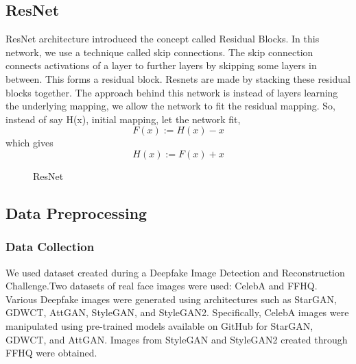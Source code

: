         \subsection{ResNet}
            ResNet\cite{DBLP:journals/corr/HeZRS15} architecture introduced the concept called Residual Blocks. In this network, we use a technique called skip connections. The skip connection connects activations of a  layer to further layers by skipping some layers in between. This forms a residual block. Resnets are made by stacking these residual blocks together. The approach behind this network is instead of layers learning the underlying mapping, we allow the network to fit the residual mapping. So, instead of say H(x), initial mapping, let the network fit,
            \begin{equation}
                F(x) := H(x) - x
            \end{equation}
            which gives
            \begin{equation}
                H(x) := F(x) + x
            \end{equation}
            \begin{figure}[hbt!]
                \caption{ResNet} \cite{enwiki:1205293224}
            \end{figure}

		\pagebreak
		\subsection{Data Preprocessing}
        \subsubsection{Data Collection}
        We used dataset created during a Deepfake Image Detection and Reconstruction Challenge.Two datasets of real face images were used: CelebA and FFHQ. Various Deepfake images were generated using architectures such as StarGAN, GDWCT, AttGAN, StyleGAN, and StyleGAN2. Specifically, CelebA images were manipulated using pre-trained models available on GitHub for StarGAN, GDWCT, and AttGAN. Images from StyleGAN and StyleGAN2 created through FFHQ were obtained.
        
